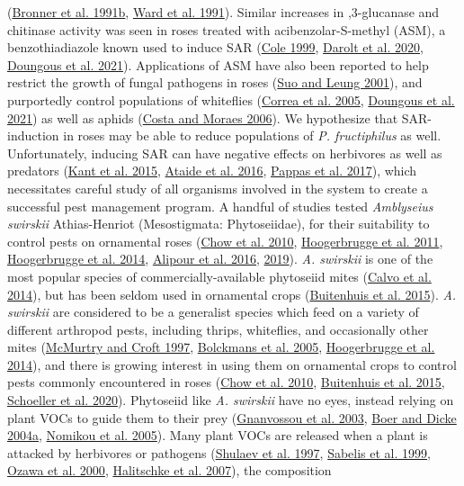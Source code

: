 \documentclass{ufdissertation}[overrideChapters] %
\begin{document}
{(\protect\hyperlink{ref-Bronner1991a}{Bronner et al. 1991b}, \protect\hyperlink{ref-Ward1991a}{Ward et al. 1991}). Similar increases in ,3-glucanase and chitinase activity was seen in roses treated with acibenzolar-S-methyl (ASM), a benzothiadiazole known used to induce SAR (\protect\hyperlink{ref-Cole1999}{Cole 1999}, \protect\hyperlink{ref-Darolt2020}{Darolt et al. 2020}, \protect\hyperlink{ref-Doungous2021}{Doungous et al. 2021}). Applications of ASM have also been reported to help restrict the growth of fungal pathogens in roses (\protect\hyperlink{ref-Suo2001}{Suo and Leung 2001}), and purportedly control populations of whiteflies (\protect\hyperlink{ref-Correa2005}{Correa et al. 2005}, \protect\hyperlink{ref-Doungous2021}{Doungous et al. 2021}) as well as aphids (\protect\hyperlink{ref-Costa2006}{Costa and Moraes 2006}). We hypothesize that SAR-induction in roses may be able to reduce populations of \emph{P. fructiphilus} as well. Unfortunately, inducing SAR can have negative effects on herbivores as well as predators (\protect\hyperlink{ref-Kant2015}{Kant et al. 2015}, \protect\hyperlink{ref-Ataide2016}{Ataide et al. 2016}, \protect\hyperlink{ref-Pappas2017}{Pappas et al. 2017}), which necessitates careful study of all organisms involved in the system to create a successful pest management program. A handful of studies tested \emph{Amblyseius swirskii} Athias-Henriot (Mesostigmata: Phytoseiidae), for their suitability to control pests on ornamental roses (\protect\hyperlink{ref-Chow2010}{Chow et al. 2010}, \protect\hyperlink{ref-Hoogerbrugge2011}{Hoogerbrugge et al. 2011}, \protect\hyperlink{ref-Hoogerbrugge2014}{Hoogerbrugge et al. 2014}, \protect\hyperlink{ref-Alipour2016}{Alipour et al. 2016}, \protect\hyperlink{ref-Alipour2019}{2019}). \emph{A. swirskii} is one of the most popular species of commercially-available phytoseiid mites (\protect\hyperlink{ref-Calvo2014}{Calvo et al. 2014}), but has been seldom used in ornamental crops (\protect\hyperlink{ref-Buitenhuis2015}{Buitenhuis et al. 2015}). \emph{A. swirskii} are considered to be a generalist species which feed on a variety of different arthropod pests, including thrips, whiteflies, and occasionally other mites (\protect\hyperlink{ref-McMurtry1997}{McMurtry and Croft 1997}, \protect\hyperlink{ref-Bolckmans2005}{Bolckmans et al. 2005}, \protect\hyperlink{ref-Hoogerbrugge2014}{Hoogerbrugge et al. 2014}), and there is growing interest in using them on ornamental crops to control pests commonly encountered in roses (\protect\hyperlink{ref-Chow2010}{Chow et al. 2010}, \protect\hyperlink{ref-Buitenhuis2015}{Buitenhuis et al. 2015}, \protect\hyperlink{ref-Schoeller2020}{Schoeller et al. 2020}). Phytoseiid like \emph{A. swirskii} have no eyes, instead relying on plant VOCs to guide them to their prey (\protect\hyperlink{ref-Gnanvossou2003}{Gnanvossou et al. 2003}, \protect\hyperlink{ref-Boer2004a}{Boer and Dicke 2004a}, \protect\hyperlink{ref-Nomikou2005}{Nomikou et al. 2005}). Many plant VOCs are released when a plant is attacked by herbivores or pathogens (\protect\hyperlink{ref-Shulaev1997}{Shulaev et al. 1997}, \protect\hyperlink{ref-Sabelis1999}{Sabelis et al. 1999}, \protect\hyperlink{ref-Ozawa2000}{Ozawa et al. 2000}, \protect\hyperlink{ref-Halitschke2007}{Halitschke et al. 2007}), the composition }
\end{document}
